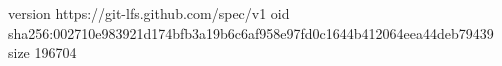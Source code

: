 version https://git-lfs.github.com/spec/v1
oid sha256:002710e983921d174bfb3a19b6c6af958e97fd0c1644b412064eea44deb79439
size 196704
